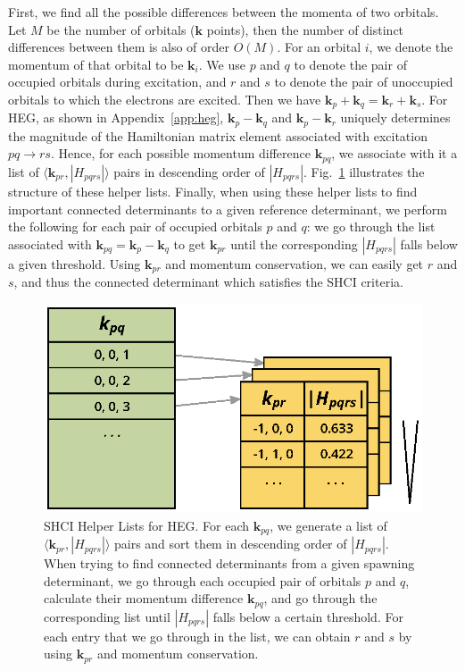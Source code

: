 \documentclass[%
reprint,
 superscriptaddress,
 amsmath,amssymb,
 aps,
]{revtex4-1}
\begin{document}
First, we find all the possible differences between the momenta of two orbitals.
Let $M$ be the number of orbitals ($\mathbf{k}$ points), then the number of distinct differences between them is also of order $O(M)$.
For an orbital $i$, we denote the momentum of that orbital to be $\mathbf{k}_{i}$.
We use $p$ and $q$ to denote the pair of occupied orbitals during excitation, and $r$ and $s$ to denote the pair of unoccupied orbitals to which the electrons are excited.
Then we have $\mathbf{k}_p + \mathbf{k}_q = \mathbf{k}_r + \mathbf{k}_s$.
For HEG, as shown in Appendix~\ref{app:heg}, $\mathbf{k}_p - \mathbf{k}_q$ and $\mathbf{k}_p - \mathbf{k}_r$ uniquely determines the magnitude of the Hamiltonian matrix element associated with excitation $pq\to rs$.
Hence, for each possible momentum difference $\mathbf{k}_{pq}$, we associate with it a list of $\langle \mathbf{k}_{pr}, |H_{pqrs}|\rangle$ pairs in descending order of $|H_{pqrs}|$.
Fig.~\ref{fig:helper} illustrates the structure of these helper lists.
Finally, when using these helper lists to find important connected determinants to a given reference determinant, we perform the following for each pair of occupied orbitals $p$ and $q$: we go through the list associated with $\mathbf{k}_{pq} = \mathbf{k}_p - \mathbf{k}_q$ to get $\mathbf{k}_{pr}$ until the corresponding $|H_{pqrs}|$ falls below a given threshold.
Using $\mathbf{k}_{pr}$ and momentum conservation, we can easily get $r$ and $s$, and thus the connected determinant which satisfies the SHCI criteria.
\begin{figure}
  \begin{center}
  \includegraphics[width=0.9\linewidth]{figs/HelperList.eps}
  \end{center}
  \vspace{-0.2cm}
  \caption{SHCI Helper Lists for HEG.
  For each $\mathbf{k}_{pq}$, we generate a list of $\langle \mathbf{k}_{pr}, |H_{pqrs}|\rangle$ pairs and sort them in descending order of $|H_{pqrs}|$.
  When trying to find connected determinants from a given spawning determinant, we go through each occupied pair of orbitals $p$ and $q$, calculate their momentum difference $\mathbf{k}_{pq}$, and go through the corresponding list until $|H_{pqrs}|$ falls below a certain threshold.
  For each entry that we go through in the list, we can obtain $r$ and $s$ by using $\mathbf{k}_{pr}$ and momentum conservation.
  }
  \label{fig:helper}
\end{figure}
\end{document}
